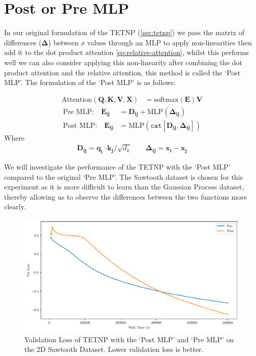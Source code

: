 \documentclass[../../main.tex]{subfiles}
\begin{document}

\section{Post or Pre MLP}

In our original formulation of the TETNP (\autoref{sec:tetnp}) we pass the matrix of differences ($\bm{\Delta}$) between $x$ values through an MLP to apply non-linearities then add it to the dot product attention \autoref{eq:relative-attention}, whilst this performs well we can also consider applying this non-linearity after combining the dot product attention and the relative attention, this method is called the `Post MLP'. The formulation of the `Post MLP' is as follows:

\begin{align}
	\text{Attention}(\bm{Q}, \bm{K}, \bm{V}, \bm{X}) &= \text{softmax}\left(\bm{E} \right) \bm{V}
\end{align}
\begin{align}
	\text{Pre MLP:} \quad \bm{E_{ij}} &= \bm{D_{ij}}+ \text{MLP}(\bm{\Delta_{ij}})\\
    \text{Post MLP:} \quad \bm{E_{ij}} &= \text{MLP}(\texttt{cat}[ \bm{D_{ij}}, \bm{\Delta_{ij}}])
\end{align}
Where 
\begin{align}
     \bm{D_{ij}} = \bm{q_i} \cdot \bm{k_j}  /\sqrt{d_k} \quad \quad    \bm{\Delta_{ij}} = \bm{x_i} - \bm{x_j}
\end{align}


We will investigate the performance of the TETNP with the `Post MLP' compared to the original `Pre MLP'. The Sawtooth dataset is chosen for this experiment as it is more difficult to learn than the Gaussian Process dataset, thereby allowing us to observe the differences between the two functions more clearly.

\begin{figure}[H]
    \centering
    \includegraphics[width=0.6\linewidth]{./fig/post-pre-kernel.pdf}
    \caption{Validation Loss of TETNP with the `Post MLP' and `Pre MLP' on the 2D Sawtooth Dataset. Lower validation loss is better.}
    \label{fig:post-pre-kernel}
\end{figure}
\end{document}
